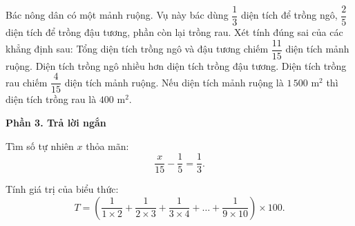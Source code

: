 \begin{ex} %
Bác nông dân có một mảnh ruộng. Vụ này bác dùng $\dfrac{1}{3}$ diện tích để trồng ngô, $\dfrac{2}{5}$ diện tích để trồng đậu tương, phần còn lại trồng rau. Xét tính đúng sai của các khẳng định sau:
\choiceTF
{\True Tổng diện tích trồng ngô và đậu tương chiếm $\dfrac{11}{15}$ diện tích mảnh ruộng.}
{Diện tích trồng ngô nhiều hơn diện tích trồng đậu tương.}
{\True Diện tích trồng rau chiếm $\dfrac{4}{15}$ diện tích mảnh ruộng.}
{\True Nếu diện tích mảnh ruộng là $1\,500\text{ m}^2$ thì diện tích trồng rau là $400\text{ m}^2$.}
\end{ex}

\textbf{Phần 3. Trả lời ngắn}

\begin{ex} %
Tìm số tự nhiên $x$ thỏa mãn:
\[
\dfrac{x}{15} - \dfrac{1}{5} = \dfrac{1}{3}.
\]
\end{ex}

\begin{ex} %
Tính giá trị của biểu thức:
\[
T = \left(\dfrac{1}{1 \times 2} + \dfrac{1}{2 \times 3} + \dfrac{1}{3 \times 4} + \dots + \dfrac{1}{9 \times 10}\right) \times 100.
\]
\end{ex}

